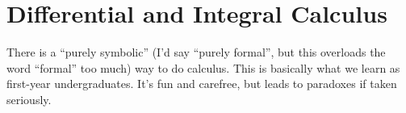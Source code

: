
\chapter{Differential and Integral Calculus}

\begin{node}\label{calculus-0000}%
There is a ``purely symbolic'' (I'd say ``purely formal'', but this
overloads the word ``formal'' too much) way to do calculus. This is
basically what we learn as first-year undergraduates. It's fun and
carefree, but leads to paradoxes if taken seriously.
\end{node}
